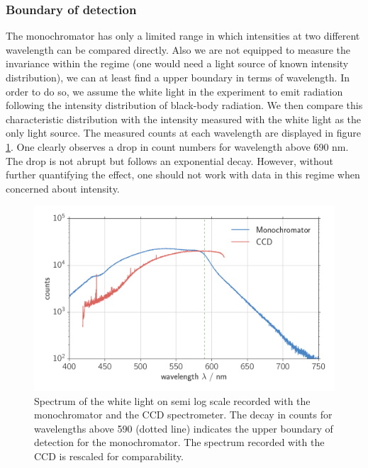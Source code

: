 \subsubsection{Boundary of detection}
The monochromator has only a limited range in which intensities at two different wavelength can be compared directly. Also 
we are not equipped to measure the invariance within the regime (one would need a light source of known intensity 
distribution), we can at least find a upper boundary in terms of wavelength. In order to do so, we assume the white light 
in the experiment to emit radiation following the intensity distribution of black-body radiation. We then compare this 
characteristic distribution with the intensity measured with the white light as the only light source. The measured counts 
at each wavelength are displayed in figure \ref{fig:mono_bound}. One clearly observes a drop in count numbers for 
wavelength above 690 nm. The drop is not abrupt but follows an exponential decay. 
However, without further quantifying the effect, one should not work with data in this regime when concerned about 
intensity. 

\begin{figure}[htpb]
    \centering
    \includegraphics[width=0.8\linewidth]{analysis/figures/mono_bound}
    \caption{Spectrum of the white light on semi log scale recorded with the monochromator and the CCD spectrometer. 
        The decay in counts for wavelengths above 590 (dotted line) indicates the upper boundary of detection for the
    monochromator. The spectrum recorded with the CCD is rescaled for comparability. }
    \label{fig:mono_bound}
\end{figure}

